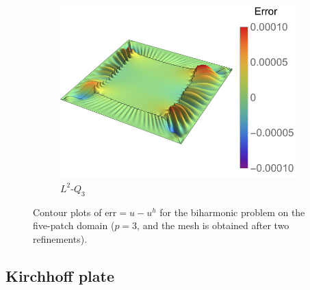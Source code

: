 \begin{figure}[ht]
\begin{subfigure}[t]{.45\linewidth}
		\includegraphics[scale=.52]{five_patch_biharmonic_L2_contour}
		\caption{$L^2$-$Q_3$}
	\end{subfigure}
	\caption{Contour plots of $\text{err}=u-u^h$ for the biharmonic problem on the five-patch domain ($p=3$, and the mesh is obtained after two refinements). }\label{fig:contour_biharmonic}
\end{figure}


\subsection{Kirchhoff plate}\label{sec:kl-plate_problem}


